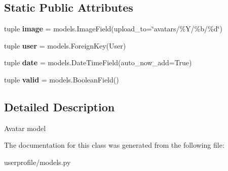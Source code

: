 \subsection*{Static Public Attributes}
\begin{DoxyCompactItemize}
\item 
\hypertarget{classsouvenir_1_1userprofile_1_1models_1_1Avatar_a2fdcf6d2135e31f1dfd39acaffdf662e}{tuple {\bfseries image} = models.\-Image\-Field(upload\-\_\-to=\char`\"{}avatars/\%Y/\%b/\%d\char`\"{})}\label{classsouvenir_1_1userprofile_1_1models_1_1Avatar_a2fdcf6d2135e31f1dfd39acaffdf662e}

\item 
\hypertarget{classsouvenir_1_1userprofile_1_1models_1_1Avatar_a974f5041cbbd94f6b89d6ea297d81c60}{tuple {\bfseries user} = models.\-Foreign\-Key(User)}\label{classsouvenir_1_1userprofile_1_1models_1_1Avatar_a974f5041cbbd94f6b89d6ea297d81c60}

\item 
\hypertarget{classsouvenir_1_1userprofile_1_1models_1_1Avatar_aaf9bd24c65d4c6e58550877bfde54e18}{tuple {\bfseries date} = models.\-Date\-Time\-Field(auto\-\_\-now\-\_\-add=True)}\label{classsouvenir_1_1userprofile_1_1models_1_1Avatar_aaf9bd24c65d4c6e58550877bfde54e18}

\item 
\hypertarget{classsouvenir_1_1userprofile_1_1models_1_1Avatar_ad9f3b768c8dd213d85cf402f1437acab}{tuple {\bfseries valid} = models.\-Boolean\-Field()}\label{classsouvenir_1_1userprofile_1_1models_1_1Avatar_ad9f3b768c8dd213d85cf402f1437acab}

\end{DoxyCompactItemize}


\subsection{Detailed Description}
\begin{DoxyVerb}Avatar model
\end{DoxyVerb}
 

The documentation for this class was generated from the following file\-:\begin{DoxyCompactItemize}
\item 
userprofile/models.\-py\end{DoxyCompactItemize}
